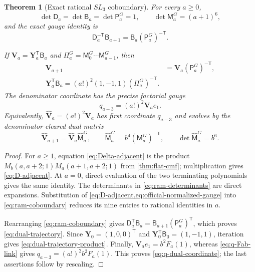 \documentclass[11pt]{article}
\newtheorem{theorem}{Theorem}[section]
\theoremstyle{definition}
\theoremstyle{remark}
\begin{document}
\begin{theorem}[Exact rational \(SL_3\) coboundary]
\label{thm:ram-gauge}
For every \(a\ge0\),
\begin{equation}\label{eq:ram-determinants}
 \det\mathsf D_a=\det\mathsf B_a=\det\mathsf P_a^G=1,
 \qquad \det\mathsf M_a^G=(a+1)^6,
\end{equation}
and the exact gauge identity is
\begin{equation}\label{eq:ram-coboundary}
 \boxed{\displaystyle
 \mathsf D_a^{-\mathsf T}\mathsf B_{a+1}
 =\mathsf B_a(\mathsf P_a^G)^{-\mathsf T}.}
\end{equation}

If \(\mathbf V_a=\mathbf Y_a^{\mathsf T}\mathsf B_a\) and
\(\Pi_a^G=\mathsf M_0^G\cdots\mathsf M_{a-1}^G\), then
\begin{align}
 \mathbf V_{a+1}&=\mathbf V_a(\mathsf P_a^G)^{-\mathsf T},
 \label{eq:dual-trajectory}\\
 \boxed{\displaystyle
 \mathbf Y_a^{\mathsf T}\mathsf B_a
 =(a!)^2(1,-1,1)(\Pi_a^G)^{-\mathsf T}.}
 \label{eq:dual-trajectory-product}
\end{align}
The denominator coordinate has the precise factorial gauge
\begin{equation}\label{eq:q-dual-coordinate}
 \boxed{\displaystyle
 q_{a-3}=(a!)^2\mathbf V_ae_1.}
\end{equation}
Equivalently, \(\widehat{\mathbf V}_a=(a!)^2\mathbf V_a\) has first
coordinate \(q_{a-3}\) and evolves by the denominator-cleared dual matrix
\begin{equation}\label{eq:denominator-cleared-dual}
 \widehat{\mathbf V}_{a+1}
 =\widehat{\mathbf V}_a\widehat{\mathsf M}_a^G,\qquad
 \widehat{\mathsf M}_a^G=b^4(\mathsf M_a^G)^{-\mathsf T},\qquad
 \det\widehat{\mathsf M}_a^G=b^6.
\end{equation}
\end{theorem}

\begin{proof}
For \(a\ge1\), equation \eqref{eq:Delta-adjacent} is the product
\(M_b(a,a+2;1)M_a(a+1,a+2;1)\) from
\cref{thm:flat-cmf}; multiplication gives \eqref{eq:D-adjacent}.  At
\(a=0\), direct evaluation of the two terminating polynomials gives the
same identity.
The determinants in \eqref{eq:ram-determinants} are direct expansions.
Substitution of \cref{eq:D-adjacent,eq:official-normalized-gauge} into
\eqref{eq:ram-coboundary} reduces its nine entries to rational identities in
\(a\).

Rearranging \eqref{eq:ram-coboundary} gives
\(\mathsf D_a^{\mathsf T}\mathsf B_a
=\mathsf B_{a+1}(\mathsf P_a^G)^{\mathsf T}\), which proves
\eqref{eq:dual-trajectory}.  Since
\(\mathbf Y_0=(1,0,0)^{\mathsf T}\) and
\(\mathbf Y_0^{\mathsf T}\mathsf B_0=(1,-1,1)\), iteration gives
\eqref{eq:dual-trajectory-product}.  Finally,
\(\mathbf V_ae_1=b^2F_a(1)\), whereas
\eqref{eq:q-Fab-link} gives
\(q_{a-3}=(a!)^2b^2F_a(1)\).  This proves
\eqref{eq:q-dual-coordinate}; the last assertions follow by rescaling.
\end{proof}
\end{document}
